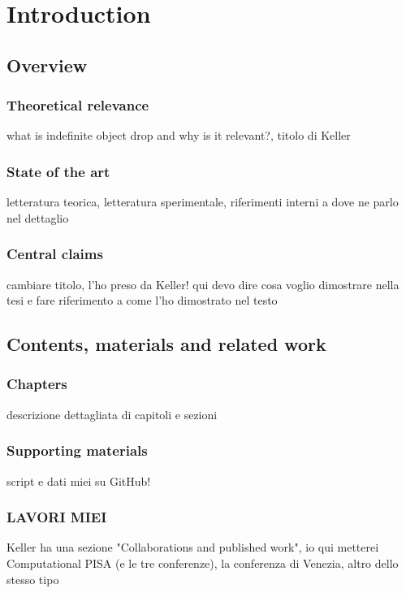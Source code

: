 \setchapterpreamble[u]{\margintoc}
\chapter{Introduction}

\section{Overview} 

\subsection{Theoretical relevance}
what is indefinite object drop and why is it relevant?, titolo di Keller

\subsection{State of the art}
letteratura teorica, letteratura sperimentale, riferimenti interni a dove ne parlo nel dettaglio

\subsection{Central claims}
cambiare titolo, l'ho preso da Keller! qui devo dire cosa voglio dimostrare nella tesi e fare riferimento a come l'ho dimostrato nel testo


\section{Contents, materials and related work} 

\subsection{Chapters}
descrizione dettagliata di capitoli e sezioni

\subsection{Supporting materials}
script e dati miei su GitHub!

\subsection{LAVORI MIEI}
Keller ha una sezione "Collaborations and published work", io qui metterei Computational PISA (e le tre conferenze), la conferenza di Venezia, altro dello stesso tipo



